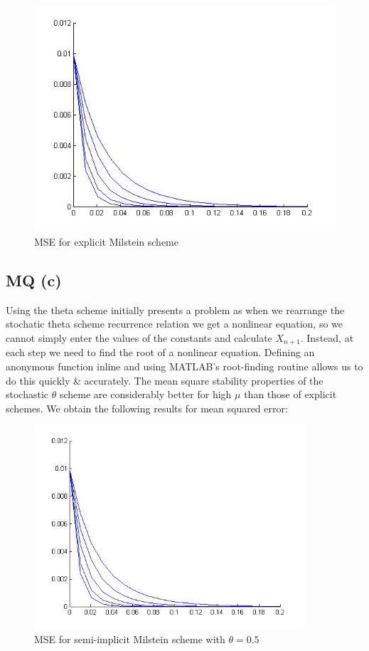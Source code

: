 \documentclass[11pt]{article} %
\begin{document}
\begin{figure}
	\centering
		\includegraphics[scale = 0.5]{MQ_stocM}
		\caption{MSE for explicit Milstein scheme}
\end{figure}

\subsection{MQ (c)}
Using the theta scheme initially presents a problem as when we rearrange the stochatic theta scheme recurrence relation we get a nonlinear equation, so we cannot simply enter the values of the constants and calculate $X_{n+1}$. Instead, at each step we need to find the root of a nonlinear equation. Defining an anonymous function inline and using MATLAB's root-finding routine allows us to do this quickly \& accurately. The mean square stability properties of the stochastic $\theta$ scheme are considerably better for high $\mu$ than those of explicit schemes. We obtain the following results for mean squared error:
\begin{figure}
	\centering
		\includegraphics[width = 0.9\textwidth]{MQ_stocM.jpg}
		\caption{MSE for semi-implicit Milstein scheme with $\theta = 0.5$}
\end{figure}
\end{document}
